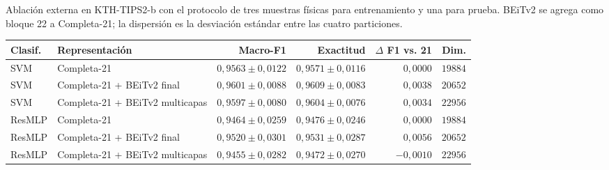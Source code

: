 \begin{resulttable}
\centering\fontsize{8}{10}\selectfont\setlength{\tabcolsep}{3.0pt}
\caption{Ablación externa en KTH-TIPS2-b con el protocolo de tres muestras físicas para entrenamiento y una para prueba. BEiTv2 se agrega como bloque 22 a Completa-21; la dispersión es la desviación estándar entre las cuatro particiones.}
\label{tab:kth-beit-extension}
\begin{tabular}{@{}llrrrr@{}}
\toprule
Clasif. & Representación & Macro-F1 & Exactitud & $\Delta$ F1 vs. 21 & Dim. \\
\midrule
SVM & Completa-21 & $0{,}9563 \pm 0{,}0122$ & $0{,}9571 \pm 0{,}0116$ & $0{,}0000$ & $19884$ \\
SVM & Completa-21 + BEiTv2 final & $0{,}9601 \pm 0{,}0088$ & $0{,}9609 \pm 0{,}0083$ & $0{,}0038$ & $20652$ \\
SVM & Completa-21 + BEiTv2 multicapas & $0{,}9597 \pm 0{,}0080$ & $0{,}9604 \pm 0{,}0076$ & $0{,}0034$ & $22956$ \\
ResMLP & Completa-21 & $0{,}9464 \pm 0{,}0259$ & $0{,}9476 \pm 0{,}0246$ & $0{,}0000$ & $19884$ \\
ResMLP & Completa-21 + BEiTv2 final & $0{,}9520 \pm 0{,}0301$ & $0{,}9531 \pm 0{,}0287$ & $0{,}0056$ & $20652$ \\
ResMLP & Completa-21 + BEiTv2 multicapas & $0{,}9455 \pm 0{,}0282$ & $0{,}9472 \pm 0{,}0270$ & $-0{,}0010$ & $22956$ \\
\bottomrule
\end{tabular}
\end{resulttable}
\FloatBarrier
